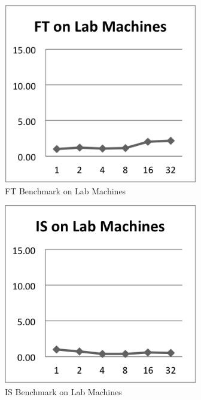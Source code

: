 \documentclass{acm_proc_article-sp}
\begin{document}
\begin{figure}[tbp]
  \centering
  \caption{FT Benchmark on Lab Machines}
	\label{LabFT}
  \includegraphics[width=20pc]{Pics-Lab/FT.png}
\end{figure}

\begin{figure}[tbp]
  \centering
  \caption{IS Benchmark on Lab Machines}
	\label{LabIS}
  \includegraphics[width=20pc]{Pics-Lab/IS.png}
\end{figure}
\end{document}
